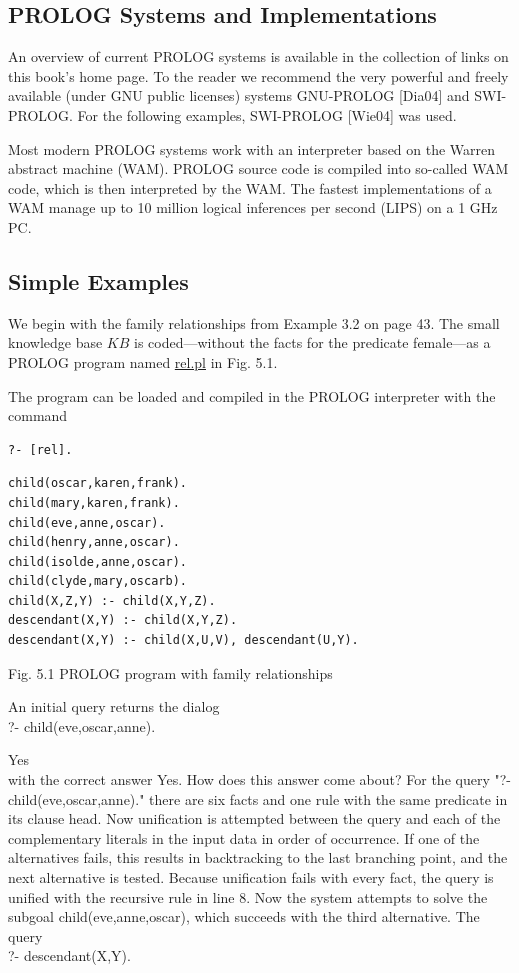 \documentclass[10pt]{book}
\begin{document}
\subsection{PROLOG Systems and Implementations}
An overview of current PROLOG systems is available in the collection of links on this book's home page. To the reader we recommend the very powerful and freely available (under GNU public licenses) systems GNU-PROLOG [Dia04] and SWI-PROLOG. For the following examples, SWI-PROLOG [Wie04] was used.

Most modern PROLOG systems work with an interpreter based on the Warren abstract machine (WAM). PROLOG source code is compiled into so-called WAM code, which is then interpreted by the WAM. The fastest implementations of a WAM manage up to 10 million logical inferences per second (LIPS) on a 1 GHz PC.

\subsection{Simple Examples}
We begin with the family relationships from Example 3.2 on page 43. The small knowledge base $KB$ is coded—without the facts for the predicate female—as a PROLOG program named \href{http://rel.pl}{rel.pl} in Fig. 5.1.

The program can be loaded and compiled in the PROLOG interpreter with the command

\begin{verbatim}
?- [rel].
\end{verbatim}

\begin{verbatim}
child(oscar,karen,frank).
child(mary,karen,frank).
child(eve,anne,oscar).
child(henry,anne,oscar).
child(isolde,anne,oscar).
child(clyde,mary,oscarb).
child(X,Z,Y) :- child(X,Y,Z).
descendant(X,Y) :- child(X,Y,Z).
descendant(X,Y) :- child(X,U,V), descendant(U,Y).
\end{verbatim}

Fig. 5.1 PROLOG program with family relationships

An initial query returns the dialog\\
?- child(eve,oscar,anne).

Yes\\
with the correct answer Yes. How does this answer come about? For the query "?- child(eve,oscar,anne)." there are six facts and one rule with the same predicate in its clause head. Now unification is attempted between the query and each of the complementary literals in the input data in order of occurrence. If one of the alternatives fails, this results in backtracking to the last branching point, and the next alternative is tested. Because unification fails with every fact, the query is unified with the recursive rule in line 8. Now the system attempts to solve the subgoal child(eve,anne,oscar), which succeeds with the third alternative. The query\\
?- descendant(X,Y).
\end{document}
